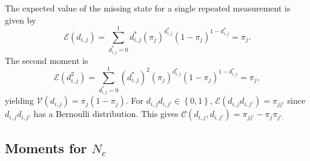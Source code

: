 \documentclass[11pt]{article}
\begin{document}
The expected value of the missing state for a single repeated measurement is given by
\begin{equation}
\mathcal{E}\left(d_{i,j}\right)=\sum_{d^{\ast}_{i,j}=0}^{1}d^{\ast}_{i,j}\left(\pi_{j}\right)^{d^{\ast}_{i,j}}\left(1-\pi_{j}\right)^{1-d^{\ast}_{i,j}}=\pi_{j}.
\end{equation}
The second moment is 
\begin{equation}
\mathcal{E}\left(d_{i,j}^{2}\right)=\sum_{d^{\ast}_{i,j}=0}^{1}\left(d^{\ast}_{i,j}\right)^{2}\left(\pi_{j}\right)^{d^{\ast}_{i,j}}\left(1-\pi_{j}\right)^{1-d^{\ast}_{i,j}}=\pi_{j},
\end{equation}
yielding $\mathcal{V}\left(d_{i,j}\right)=\pi_{j}\left(1-\pi_{j}\right)$. For $d_{i,j}d_{i,j'}\in\left\{0,1\right\}$, $\mathcal{E}(d_{i,j}d_{i,j'})=\pi_{jj'}$ since $d_{i,j}d_{i,j'}$ has a Bernoulli distribution. This gives $\mathcal{C}\left(d_{i,j},d_{i,j'}\right)=\pi_{jj'}-\pi_{j}\pi_{j'.}$

\subsection{Moments for $N_c$}
\end{document}
